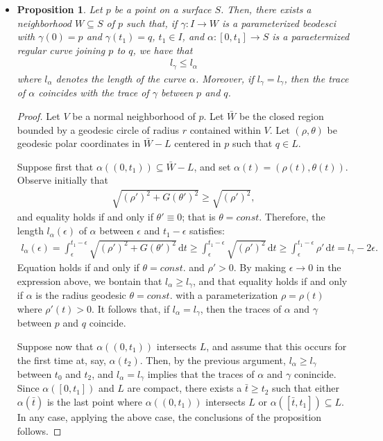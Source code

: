 \documentclass[10pt]{article}
\newtheorem{proposition}[lemma]{Proposition}
\newcommand{\dee}{\mathrm{d}}
\newcommand{\ra}{\rightarrow}
\newcommand{\sseq}{\subseteq}
\begin{document}
  \begin{itemize}
    \item \begin{proposition}
      Let $p$ be a point on a surface $S$. Then, there exists a neighborhood $W \sseq S$ of $p$ such that, if $\gamma: I \ra W$ is a parameterized beodesci with $\gamma(0) = p$ and $\gamma(t_1) = q$, $t_1 \in I$, and $\alpha: [0,t_1] \ra S$ is a paraetermized regular curve joining $p$ to $q$, we have that
      \begin{align*}
        l_\gamma \leq l_\alpha
      \end{align*}
      where $l_\alpha$ denotes the length of the curve $\alpha$. Moreover, if $l_\gamma = l_\gamma$, then the trace of $\alpha$ coincides with the trace of $\gamma$ between $p$ and $q$.
    \end{proposition}
    \begin{proof}
      Let $V$ be a normal neighborhood of $p$. Let $\bar W$ be the closed region bounded by a geodesic circle of radius $r$ contained within $V$. Let $(\rho,\theta)$ be geodesic polar coordinates in $\bar W - L$ centered in $p$ such that $q \in L$.

      Suppose first that $\alpha((0,t_1)) \sseq \bar W - L$, and set $\alpha(t) = (\rho(t), \theta(t))$. Observe initially that
      \begin{align*}
        \sqrt{(\rho')^2 + G(\theta')^2} \geq \sqrt{(\rho')^2},
      \end{align*}
      and equality holds if and only if $\theta' \equiv 0$; that is $\theta = const.$ Therefore, the length $l_\alpha(\epsilon)$ of $\alpha$ between $\epsilon$ and $t_1 - \epsilon$ satisfies:
      \begin{align*}
        l_\alpha(\epsilon) = \int_{\epsilon}^{t_1 -\epsilon} \sqrt{(\rho')^2 + G(\theta')^2}\, \dee t \geq \int_{\epsilon}^{t_1 - \epsilon} \sqrt{(\rho')^2}\, \dee t \geq \int_{\epsilon}^{t_1 - \epsilon} \rho'\, \dee t = l_\gamma - 2\epsilon.
      \end{align*}
      Equation holds if and only if $\theta = const.$ and $\rho' > 0$. By making $\epsilon \ra 0$ in the expression above, we bontain that $l_\alpha \geq l_\gamma$, and that equality holds if and only if $\alpha$ is the radius geodesic $\theta = const.$ with a parameterization $\rho = \rho(t)$ where $\rho'(t) > 0$. It follows that, if $l_\alpha = l_\gamma$, then the traces of $\alpha$ and $\gamma$ between $p$ and $q$ coincide.

      Suppose now that $\alpha((0,t_1))$ intersects $L$, and assume that this occurs for the first time at, say, $\alpha(t_2)$. Then, by the previous argument, $l_\alpha \geq l_\gamma$ between $t_0$ and $t_2$, and $l_\alpha = l_\gamma$ implies that the traces of $\alpha$ and $\gamma$ conincide. Since $\alpha([0,t_1])$ and $L$ are compact, there exists a $\bar t \geq t_2$ such that either $\alpha(\bar t)$ is the last point where $\alpha((0,t_1))$ intersects $L$ or $\alpha([\bar t, t_1]) \sseq L$. In any case, applying the above case, the conclusions of the proposition follows.


\end{proof}
\end{itemize}
\end{document}
